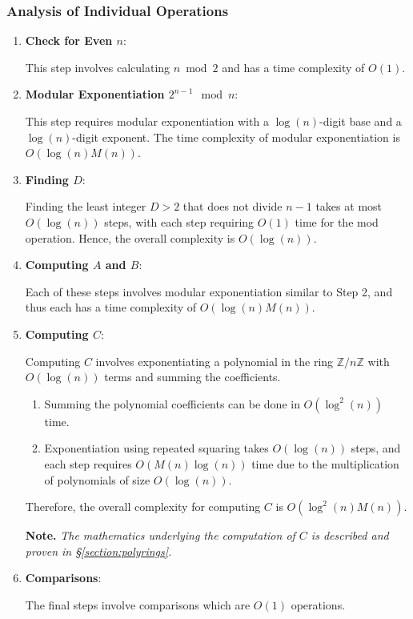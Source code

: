 \documentclass{article}
\theoremstyle{plain}
\theoremstyle{definition}
\begin{document}
\subsubsection{Analysis of Individual Operations}
\begin{enumerate}
    \item \textbf{Check for Even \( n \)}:
    
        This step involves calculating $n \bmod{2}$ and has a time complexity of \( O(1) \).

    \item \textbf{Modular Exponentiation \( 2^{n-1} \mod n \)}:
    
        This step requires modular exponentiation with a \( \log(n) \)-digit base and a \( \log(n) \)-digit exponent. The time complexity of modular exponentiation is \( O(\log(n) M(n)) \).

    \item \textbf{Finding \( D \)}:
    
        Finding the least integer \( D > 2 \) that does not divide \( n-1 \) takes at most \( O(\log(n)) \) steps, with each step requiring \( O(1) \) time for the mod operation. Hence, the overall complexity is \( O(\log(n)) \).

    \item \textbf{Computing \( A \) and \( B \)}:
    
        Each of these steps involves modular exponentiation similar to Step 2, and thus each has a time complexity of \( O(\log(n) M(n)) \).

    \item \textbf{Computing \( C \)}:
    
        Computing \( C \) involves exponentiating a polynomial in the ring \(\mathbb{Z}/n\mathbb{Z}\) with \( O(\log(n)) \) terms and summing the coefficients.
        \begin{enumerate}
            \item Summing the polynomial coefficients can be done in \( O(\log^2(n)) \) time.
            \item Exponentiation using repeated squaring takes \( O(\log(n)) \) steps, and each step requires \( O(M(n)\log(n)) \) time due to the multiplication of polynomials of size \( O(\log(n)) \).
        \end{enumerate}
         Therefore, the overall complexity for computing \( C \) is \( O(\log^2(n) M(n)) \).
         
         \textbf{Note.} \textit{The mathematics underlying the computation of \( C \) is described and proven in \S \ref{section:polyrings}.}

    \item \textbf{Comparisons}:
    
        The final steps involve comparisons which are \( O(1) \) operations.
\end{enumerate}
\end{document}

